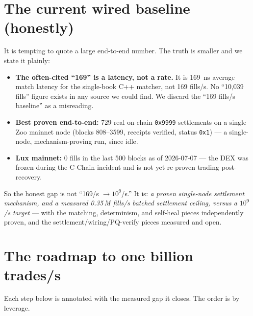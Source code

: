 \documentclass[11pt,a4paper]{article}
\begin{document}
\section{The current wired baseline (honestly)}\label{sec:baseline}

It is tempting to quote a large end-to-end number. The truth is smaller
and we state it plainly:
\begin{itemize}[leftmargin=2em,itemsep=1pt]
  \item \textbf{The often-cited ``169'' is a latency, not a rate.} It is
        \SI{169}{ns} average match latency for the single-book C++
        matcher, not 169 fills/s. No ``10{,}039 fills'' figure exists in
        any source we could find. We discard the ``169 fills/s
        baseline'' as a misreading.
  \item \textbf{Best proven end-to-end:} 729 real on-chain
        \texttt{0x9999} settlements on a single Zoo mainnet node (blocks
        808--3599, receipts verified, status \texttt{0x1}) --- a
        single-node, mechanism-proving run, since idle.
  \item \textbf{Lux mainnet:} 0 fills in the last 500 blocks as of
        2026-07-07 --- the DEX was frozen during the C-Chain incident and
        is not yet re-proven trading post-recovery.
\end{itemize}

So the honest gap is not ``169/s $\to 10^9$/s.'' It is: \emph{a proven
single-node settlement mechanism, and a measured 0.35\,M fills/s batched
settlement ceiling, versus a $10^9$/s target} --- with the matching,
determinism, and self-heal pieces independently proven, and the
settlement/wiring/PQ-verify pieces measured and open.

\section{The roadmap to one billion trades/s}\label{sec:roadmap}

Each step below is annotated with the measured gap it closes. The order
is by leverage.
\end{document}

